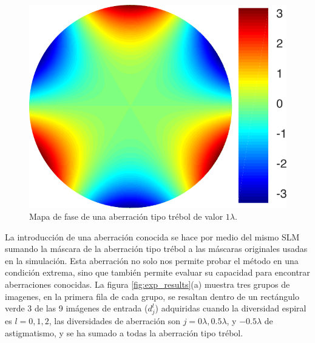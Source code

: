 \begin{figure}[h!]
\centering
\includegraphics[scale=.5]{trefoil.pdf}
\caption[Aberración tipo trébol.]{Mapa de fase de una aberración tipo
  trébol de valor $1\lambda$.} 
\label{fig:trefoil_aber}
\end{figure} 

La introducción de una aberración conocida se hace por medio del mismo
SLM sumando la máscara de la aberración tipo trébol a las máscaras 
originales usadas en la simulación. %
Esta aberración no solo nos permite probar el
método en una condición extrema, sino que también permite evaluar
su capacidad para encontrar aberraciones conocidas. 
La figura \ref{fig:exp_results}(a) muestra tres grupos de imagenes, en
la primera fila de cada grupo, se resaltan dentro
de un rectángulo verde 3 de las 9 imágenes de entrada ($d_j^l$)
adquiridas cuando la diversidad espiral es $l=0,1,2$, las diversidades
de aberración son $j = 0\lambda, 0.5\lambda$, y  $-0.5\lambda$ de
astigmatismo, y se ha sumado a todas la aberración tipo trébol.   


